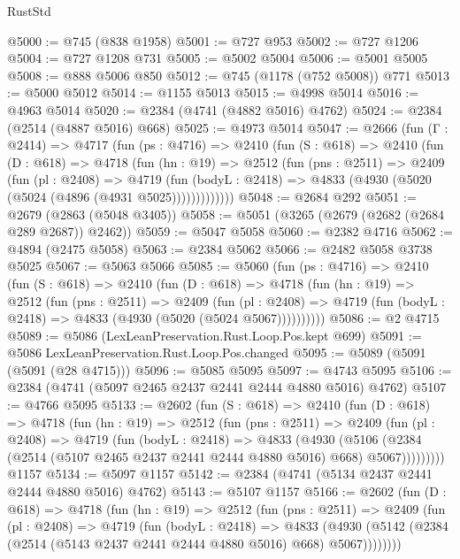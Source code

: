 \begin{lexlean}{RustStd}
\begin{coremodule}
@5000 := @745 (@838 @1958)
@5001 := @727 @953
@5002 := @727 @1206
@5004 := @727 @1208 @731
@5005 := @5002 @5004
@5006 := @5001 @5005
@5008 := @888 @5006 @850
@5012 := @745 (@1178 (@752 @5008)) @771
@5013 := @5000 @5012
@5014 := @1155 @5013
@5015 := @4998 @5014
@5016 := @4963 @5014
@5020 := @2384 (@4741 (@4882 @5016) @4762)
@5024 := @2384 (@2514 (@4887 @5016) @668)
@5025 := @4973 @5014
@5047 := @2666
    (fun (Γ : @2414) =>
    @4717
      (fun (ps : @4716) =>
      @2410
        (fun (S : @618) =>
        @2410
          (fun (D : @618) =>
          @4718
            (fun (hn : @19) =>
            @2512
              (fun (pns : @2511) =>
              @2409
                (fun (pl : @2408) =>
                @4719
                  (fun (bodyL : @2418) =>
                  @4833 (@4930 (@5020 (@5024 (@4896 (@4931 @5025)))))))))))))
@5048 := @2684 @292
@5051 := @2679 (@2863 (@5048 @3405))
@5058 := @5051 (@3265 (@2679 (@2682 (@2684 @289 @2687)) @2462))
@5059 := @5047 @5058
@5060 := @2382 @4716
@5062 := @4894 (@2475 @5058)
@5063 := @2384 @5062
@5066 := @2482 @5058 @3738 @5025
@5067 := @5063 @5066
@5085 := @5060
    (fun (ps : @4716) =>
    @2410
      (fun (S : @618) =>
      @2410
        (fun (D : @618) =>
        @4718
          (fun (hn : @19) =>
          @2512
            (fun (pns : @2511) =>
            @2409
              (fun (pl : @2408) =>
              @4719 (fun (bodyL : @2418) => @4833 (@4930 (@5020 (@5024 @5067))))))))))
@5086 := @2 @4715
@5089 := @5086 (LexLeanPreservation.Rust.Loop.Pos.kept @699)
@5091 := @5086 LexLeanPreservation.Rust.Loop.Pos.changed
@5095 := @5089 (@5091 (@5091 (@28 @4715)))
@5096 := @5085 @5095
@5097 := @4743 @5095
@5106 := @2384 (@4741 (@5097 @2465 @2437 @2441 @2444 @4880 @5016) @4762)
@5107 := @4766 @5095
@5133 := @2602
    (fun (S : @618) =>
    @2410
      (fun (D : @618) =>
      @4718
        (fun (hn : @19) =>
        @2512
          (fun (pns : @2511) =>
          @2409
            (fun (pl : @2408) =>
            @4719
              (fun (bodyL : @2418) =>
              @4833
                (@4930
                  (@5106
                    (@2384 (@2514 (@5107 @2465 @2437 @2441 @2444 @4880 @5016) @668) @5067)))))))))
    @1157
@5134 := @5097 @1157
@5142 := @2384 (@4741 (@5134 @2437 @2441 @2444 @4880 @5016) @4762)
@5143 := @5107 @1157
@5166 := @2602
    (fun (D : @618) =>
    @4718
      (fun (hn : @19) =>
      @2512
        (fun (pns : @2511) =>
        @2409
          (fun (pl : @2408) =>
          @4719
            (fun (bodyL : @2418) =>
            @4833
              (@4930 (@5142 (@2384 (@2514 (@5143 @2437 @2441 @2444 @4880 @5016) @668) @5067))))))))

\end{coremodule}
\end{lexlean}
